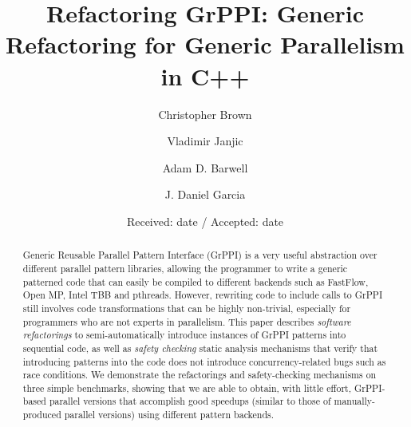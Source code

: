 \title{Refactoring GrPPI: Generic Refactoring for Generic Parallelism in C++}%



\author{Christopher Brown         \and
        Vladimir Janjic \and 
        Adam D. Barwell \and
        J. Daniel Garcia
}



\date{Received: date / Accepted: date}

\maketitle

\begin{abstract}
Generic Reusable Parallel Pattern Interface (GrPPI) is a very useful abstraction over different parallel pattern libraries, allowing the programmer to write a generic patterned code that can easily be compiled to different backends such as FastFlow, Open MP, Intel TBB and pthreads. However, rewriting code to include calls to GrPPI still involves code transformations that can be highly non-trivial, especially for programmers who are not experts in parallelism. This paper describes \emph{software refactorings} to semi-automatically introduce instances of GrPPI patterns into sequential code, as well as \emph{safety checking} static analysis mechanisms that verify that introducing patterns into the code does not introduce concurrency-related bugs such as race conditions. We demonstrate the refactorings and safety-checking mechanisms on three simple benchmarks, showing that we are able to obtain, with little effort, GrPPI-based parallel versions that accomplish good speedups (similar to those of manually-produced parallel versions) using different pattern backends.
\end{abstract}

